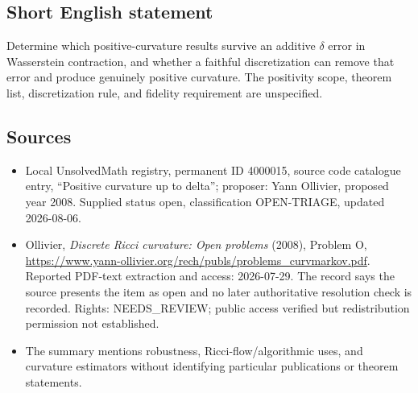 \documentclass[11pt]{article}
\begin{document}
\subsection{Short English statement}
Determine which positive-curvature results survive an additive $\delta$ error in Wasserstein contraction, and whether a faithful discretization can remove that error and produce genuinely positive curvature. The positivity scope, theorem list, discretization rule, and fidelity requirement are unspecified.
\subsection{Sources}
\begin{itemize}
\item Local UnsolvedMath registry, permanent ID 4000015, source code catalogue entry, ``Positive curvature up to delta''; proposer: Yann Ollivier, proposed year 2008. Supplied status open, classification OPEN-TRIAGE, updated 2026-08-06.
\item Ollivier, \emph{Discrete Ricci curvature: Open problems} (2008), Problem O, \url{https://www.yann-ollivier.org/rech/publs/problems_curvmarkov.pdf}. Reported PDF-text extraction and access: 2026-07-29. The record says the source presents the item as open and no later authoritative resolution check is recorded. Rights: NEEDS\_REVIEW; public access verified but redistribution permission not established.
\item The summary mentions robustness, Ricci-flow/algorithmic uses, and curvature estimators without identifying particular publications or theorem statements.
\end{itemize}
\end{document}
